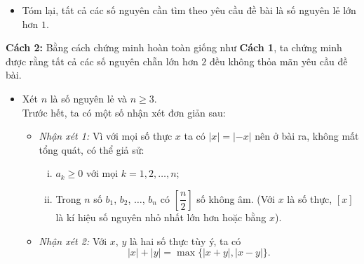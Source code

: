 \begin{bt}
{\begin{itemize}
			Thật vậy, trước hết, do $s=\heva{&(a_1-a_2)+(a_3-a_4)+\ldots+(a_{m-1}-a_m)&\text{ nếu }m\text{ chẵn }\\&(a_1-a_2)+(a_3-a_4)+\ldots+(a_{m-2}-a_{m-1})+a_m&\text{ nếu }m\text{ lẻ }}$ và $s=\heva{&a_1-(a_2-a_3)-(a_4-a_5)-\ldots-(a_{m-2}-a_{m-1})-a_m&\text{ nếu }m\text{ chẵn }\\&a_1-(a_2-a_3)-(a_4-a_5)-\ldots-(a_{m-1}-a_m)&\text{ nếu }m\text{ lẻ }}$\\
			nên từ $a_1\ge a_2\ge\ldots\ge a_m\ge0$ suy ra $0\le s\le a_1\le1$.\\
			Bằng cách tương tự, ta cũng chứng minh được rằng $0\le t\le-a_n\le1$.\\
			Từ đó, do tính đối xứng của $s$ và $t$ trong bất đẳng thức $(1.2)$, không mất tổng quát, ta có thể giả sử $s\ge t$. Khi đó:
			\begin{itemize}
				\item Nếu $1-s-t\ge0$, ta có $|s-t|+|1-s-t|=s-t+1-s-t=1-2t\le1$
				\item Nếu $1-s-t<0$, ta có $|s-t|+|1-s-t|=s-t-1+s+t=2s-1\le1$.
			\end{itemize}
			Như vậy, $(1.2)$ được chứng minh và điều này chứng tỏ tất các số nguyên lẻ $n\ge3$ có tính chất như đề bài yêu cầu.
			\item Tóm lại, tất cả các số nguyên cần tìm theo yêu cầu đề bài là số nguyên lẻ lớn hơn $1$.
		\end{itemize}
		\textbf{Cách 2:} Bằng cách chứng minh hoàn toàn giống như \textbf{Cách 1}, ta chứng minh được rằng tất cả các số nguyên chẵn lớn hơn $2$ đều không thỏa mãn yêu cầu đề bài.
		\begin{itemize}
			\item Xét $n$ là số nguyên lẻ và $n\ge3$.\\
			Trước hết, ta có một số nhận xét đơn giản sau:
			\begin{itemize}
				\item \textit{Nhận xét 1:} Vì với mọi số thực $x$ ta có $|x|=|-x|$ nên ở bài ra, không mất tổng quát, có thể giả sử:
				\begin{enumerate}[i)]
					\item $a_k\ge0$ với mọi $k=1,2,\ldots,n$;
					\item Trong $n$ số $b_1$, $b_2$, $\ldots$, $b_n$ có $\left[\dfrac{n}{2}\right]$ số không âm. (Với $x$ là số thực, $[x]$ là kí hiệu số nguyên nhỏ nhất lớn hơn hoặc bằng $x$).
				\end{enumerate}
				\item \textit{Nhận xét 2:} Với $x$, $y$ là hai số thực tùy ý, ta có $$|x|+|y|=\max\{|x+y|,|x-y|\}.$$

\end{itemize}
\end{itemize}}
\end{bt}
